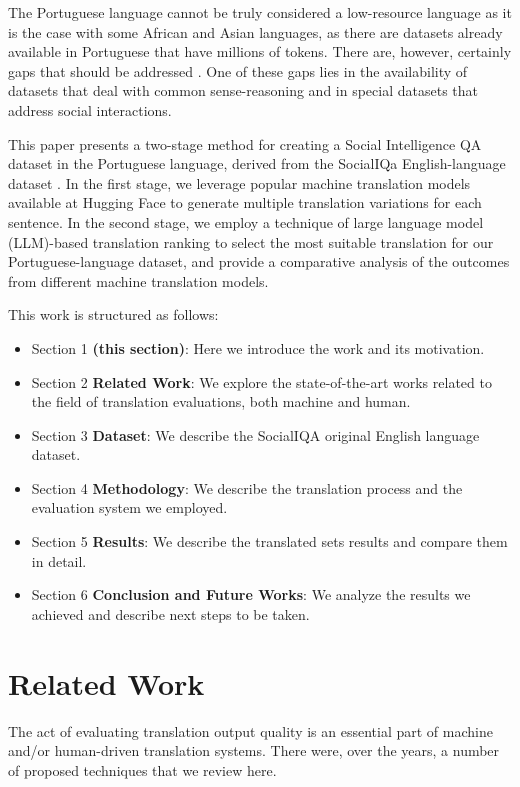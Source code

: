 \documentclass[runningheads]{llncs}
\begin{document}
The Portuguese language cannot be truly considered a low-resource language as
it is the case with some African and Asian languages, as there are
datasets already available in Portuguese that have millions of tokens. There
are, however, certainly gaps that should be addressed \cite{ghafoor2021impact}.
One of these gaps lies in the availability of datasets that deal with common
sense-reasoning and in special datasets that address social interactions.

This paper presents a two-stage method for creating a Social Intelligence QA dataset in the Portuguese language, derived from the SocialIQa English-language dataset \cite{sap2019socialiqa}. In the first stage, we leverage popular machine translation models available at Hugging Face to generate multiple translation variations for each sentence. In the second stage, we employ a technique of large language model (LLM)-based translation ranking to select the most suitable translation for our Portuguese-language dataset, and provide a comparative analysis of the outcomes from different machine translation models.

This work is structured as follows:
\begin{itemize}
    \item Section 1 \textbf{(this section)}: Here we introduce the work and its motivation.
    \item Section 2 \textbf{Related Work}: We explore the state-of-the-art works related to the field of translation evaluations, both machine and human.
    \item Section 3 \textbf{Dataset}: We describe the SocialIQA original English
    language dataset.
    \item Section 4 \textbf{Methodology}: We describe the translation process
    and the evaluation system we employed.
    \item Section 5 \textbf{Results}: We describe the translated sets results
    and compare them in detail.
    \item Section 6 \textbf{Conclusion and Future Works}: We analyze the results
    we achieved and describe next steps to be taken.
\end{itemize}

\section{Related Work}

The act of evaluating translation output quality is an essential part of machine and/or human-driven translation systems. There were, over the years, a number of proposed techniques that we review here.
\end{document}
